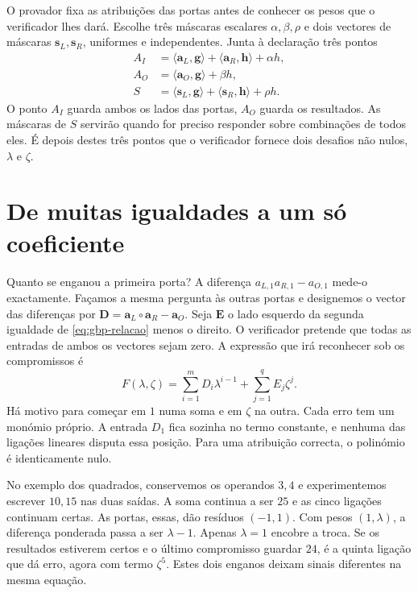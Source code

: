O provador fixa as atribuições das portas antes de conhecer os pesos
que o verificador lhes dará. Escolhe três máscaras escalares
\(\alpha,\beta,\rho\) e dois vectores de máscaras
\(\boldsymbol s_L,\boldsymbol s_R\), uniformes e independentes.
Junta à declaração três pontos
\[
 \begin{aligned}
 A_I&=\langle\boldsymbol a_L,\boldsymbol g\rangle+
       \langle\boldsymbol a_R,\boldsymbol h\rangle+\alpha h,\\
 A_O&=\langle\boldsymbol a_O,\boldsymbol g\rangle+\beta h,\\
 S&=\langle\boldsymbol s_L,\boldsymbol g\rangle+
       \langle\boldsymbol s_R,\boldsymbol h\rangle+\rho h .
 \end{aligned}
\]
O ponto \(A_I\) guarda ambos os lados das portas, \(A_O\) guarda os
resultados. As máscaras de \(S\) servirão quando for preciso responder
sobre combinações de todos eles. É depois destes três pontos que o
verificador fornece dois desafios não nulos, \(\lambda\) e \(\zeta\).

\section{De muitas igualdades a um só coeficiente}
\label{sec:gbp-coeficiente}

Quanto se enganou a primeira porta? A diferença
\(a_{L,1}a_{R,1}-a_{O,1}\) mede-o exactamente. Façamos a mesma pergunta
às outras portas e designemos o vector das diferenças por
\(\boldsymbol D=\boldsymbol a_L\circ\boldsymbol a_R-\boldsymbol a_O\).
Seja \(\boldsymbol E\) o lado esquerdo da segunda igualdade de
\eqref{eq:gbp-relacao} menos o direito. O verificador pretende que
todas as entradas de ambos os vectores sejam zero. A expressão que irá
reconhecer sob os compromissos é
\begin{equation}
  F(\lambda,\zeta)=
  \sum_{i=1}^{m}D_i\lambda^{i-1}
  +\sum_{j=1}^{q}E_j\zeta^j .
 \label{eq:gbp-residuos}
\end{equation}
Há motivo para começar em \(1\) numa soma e em \(\zeta\) na outra.
Cada erro tem um monómio próprio. A entrada \(D_1\) fica sozinha no
termo constante, e nenhuma das ligações lineares disputa essa posição.
Para uma atribuição correcta, o polinómio é identicamente nulo.

No exemplo dos quadrados, conservemos os operandos \(3,4\) e
experimentemos escrever \(10,15\) nas duas saídas. A soma continua a
ser \(25\) e as cinco ligações continuam certas. As portas, essas,
dão resíduos \((-1,1)\). Com pesos \((1,\lambda)\), a diferença
ponderada passa a ser \(\lambda-1\). Apenas \(\lambda=1\) encobre a
troca. Se os resultados estiverem certos e o último compromisso guardar
\(24\), é a quinta ligação que dá erro, agora com termo \(\zeta^5\).
Estes dois enganos deixam sinais diferentes na mesma equação.


